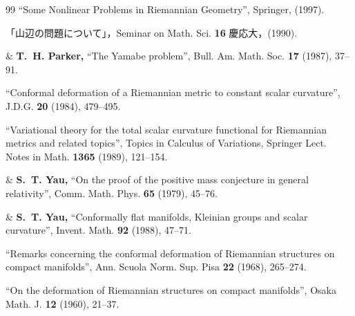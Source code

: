 \documentclass[uplatex,dvipdfmx]{jlreq}
\begin{document}
\begin{thebibliography}{99}
   ``Some Nonlinear Problems in Riemannian Geometry'',
   Springer, (1997).

   「山辺の問題について」，Seminar on Math. Sci.
   \textbf{16} 慶応大，(1990).

 \& {\bfseries T.~H. Parker,}
   ``The Yamabe problem'', Bull. Am. Math. Soc.
   \textbf{17} (1987), 37--91.

   ``Conformal deformation of a Riemannian metric to constant
   scalar curvature'', J.D.G.
   \textbf{20} (1984), 479--495.

   ``Variational theory for the total scalar curvature functional
   for Riemannian metrics and related topics'',
   Topics in Calculus of Variations, Springer Lect. Notes in Math. \textbf{1365}
   (1989), 121--154.

 \& {\bfseries S.~T. Yau,}
   ``On the proof of the positive mass conjecture
   in general relativity'', Comm. Math. Phys.
   \textbf{65} (1979), 45--76.

 \& {\bfseries S.~T. Yau,}
   ``Conformally flat manifolds, Kleinian groups
   and scalar curvature'', Invent. Math.
   \textbf{92} (1988), 47--71.

   ``Remarks concerning the conformal deformation of Riemannian
   structures on compact manifolds'', Ann. Scuola Norm. Sup. Pisa
   \textbf{22} (1968), 265--274.

   ``On the deformation of Riemannian structures on compact
   manifolds'', Osaka Math. J.
   \textbf{12} (1960), 21--37.
\end{thebibliography}
\end{document}
